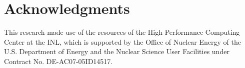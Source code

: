 \documentclass{style/nseJournal}
\providecommand{\DIFaddbegin}{} %
\providecommand{\DIFaddend}{} %
\providecommand{\DIFdelbegin}{} %
\providecommand{\DIFdelend}{} %
\begin{document}
\pagebreak

\section*{Acknowledgments}

This research made use of the resources of the High Performance Computing Center at the \gls*{INL}, which is supported by the Office of Nuclear Energy of the U.S. Department of Energy and the Nuclear Science User Facilities under Contract No. DE-AC07-05ID14517.

\pagebreak

\DIFdelbegin %
\DIFdelend \DIFaddbegin 
\DIFaddend 
\end{document}

